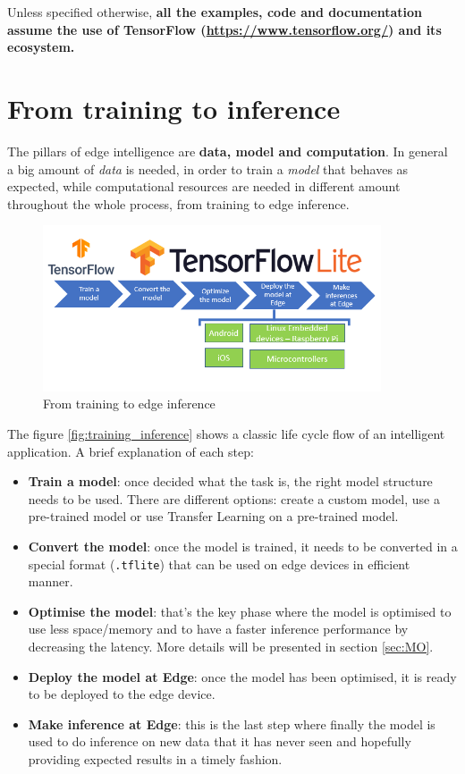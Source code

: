 Unless specified otherwise, \textbf{all the examples, code and documentation
assume the use of TensorFlow (\url{https://www.tensorflow.org/}) and its
ecosystem.}

\section{From training to inference}\label{sec:training}

The pillars of edge intelligence are \textbf{data, model and computation}.
In general a big amount of \textit{data} is needed, in order to train a
\textit{model} that behaves as expected, while computational resources are
needed in different amount throughout the whole process, from training to edge
inference.

\begin{figure}[ht]
    \includegraphics[width=10cm]{images/introduction/training_inference_flow.png}
    \centering
    \caption{From training to edge inference}\label{fig:training_inference}
\end{figure}

The figure \autoref{fig:training_inference} shows a classic life cycle flow of
an intelligent application. A brief explanation of each step:

\begin{itemize}
    \item \textbf{Train a model}: once decided what the task is, the right
        model structure needs to be used. There are different options: create a
        custom model, use a pre-trained model or use Transfer Learning on a
        pre-trained model.
    \item \textbf{Convert the model}: once the model is trained, it needs to be
        converted in a special format (\texttt{.tflite}) that can be used on
        edge devices in efficient manner.
    \item \textbf{Optimise the model}: that's the key phase where the model is
        optimised to use less space/memory and to have a faster inference
        performance by decreasing the latency. More details will be presented
        in section \autoref{sec:MO}.
    \item \textbf{Deploy the model at Edge}: once the model has been optimised,
        it is ready to be deployed to the edge device.
    \item \textbf{Make inference at Edge}: this is the last step where finally
        the model is used to do inference on new data that it has never seen
        and hopefully providing expected results in a timely fashion.
\end{itemize}

